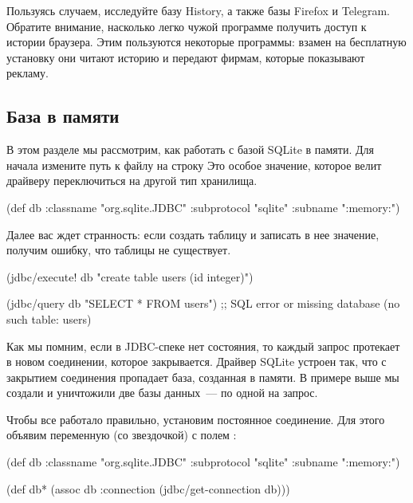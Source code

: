 Пользуясь случаем, исследуйте базу History, а также базы Firefox и Telegram. Обратите внимание, насколько легко чужой программе получить доступ к истории браузера. Этим пользуются некоторые программы: взамен на бесплатную установку они читают историю и передают фирмам, которые показывают рекламу.

\subsection{База в памяти}

В этом разделе мы рассмотрим, как работать с базой SQLite в памяти. Для начала измените путь к файлу на строку  Это особое значение, которое велит драйверу переключиться на другой тип хранилища.


\begin{english}
  \begin{clojure}
(def db
  {:classname   "org.sqlite.JDBC"
   :subprotocol "sqlite"
   :subname     ":memory:"})
  \end{clojure}
\end{english}

Далее вас ждет странность: если создать таблицу и записать в нее значение, получим ошибку, что таблицы не существует.

\begin{english}
  \begin{clojure}
(jdbc/execute! db "create table users (id integer)")

(jdbc/query db "SELECT * FROM users")
;; SQL error or missing database (no such table: users)
  \end{clojure}
\end{english}

Как мы помним, если в JDBC-спеке нет состояния, то каждый запрос протекает в новом соединении, которое закрывается. Драйвер SQLite устроен так, что с закрытием соединения пропадает база, созданная в памяти. В примере выше мы создали и уничтожили две базы данных~--- по одной на запрос.

Чтобы все работало правильно, установим постоянное соединение. Для этого объявим переменную  (со звездочкой) с полем :

\begin{english}
  \begin{clojure}
(def db
  {:classname   "org.sqlite.JDBC"
   :subprotocol "sqlite"
   :subname     ":memory:"})

(def db*
  (assoc db :connection
         (jdbc/get-connection db)))
  \end{clojure}
\end{english}

